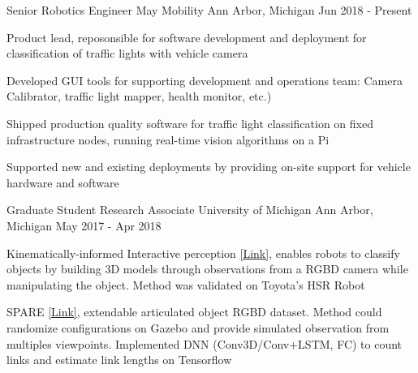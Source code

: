 \vspace{-2mm}

\begin{cventries}

  \cventry
    {Senior Robotics Engineer} %
    {May Mobility} %
    {Ann Arbor, Michigan} %
    {Jun 2018 - Present} %
    {
      \begin{cvitems} %
        \item {Product lead, reposonsible for software development and deployment for classification of traffic lights with vehicle camera}
        \item {Developed GUI tools for supporting development and operations team: Camera Calibrator, traffic light mapper, health monitor, etc.)}
        \item {Shipped production quality software for  traffic light classification on fixed infrastructure nodes, running real-time vision algorithms on a Pi}
        \item {Supported new and existing deployments by providing on-site support for vehicle hardware and software}
      \end{cvitems}
    }

  \cventry
    {Graduate Student Research Associate} %
    {University of Michigan} %
    {Ann Arbor, Michigan} %
    {May 2017 - Apr 2018} %
    {
      \begin{cvitems} %
        \item {Kinematically-informed Interactive perception \href{https://arxiv.org/pdf/1901.05580}{[Link]}, enables robots to classify objects by building 3D models through observations from a RGBD camera while manipulating the object. Method was validated on Toyota’s HSR Robot}
        \item SPARE {\href{https://arxiv.org/pdf/1803.11147}{[Link]}, extendable articulated object RGBD dataset. Method could randomize configurations on Gazebo and provide simulated observation from multiples viewpoints. Implemented DNN (Conv3D/Conv+LSTM, FC) to count links and estimate link lengths on Tensorflow}
      \end{cvitems}
    }


\end{cventries}
